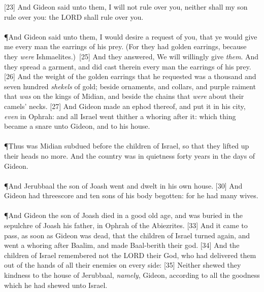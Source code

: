 [23] \textcolor[cmyk]{0.99998,1,0,0}{And Gideon said unto them, I will not rule over you, neither shall my son rule over you: the LORD shall rule over you.}\\
\\
\P \textcolor[cmyk]{0.99998,1,0,0}{And Gideon said unto them, I would desire a request of you, that ye would give me every man the earrings of his prey. (For they had golden earrings, because they \emph{were} Ishmaelites.)}\
[25] \textcolor[cmyk]{0.99998,1,0,0}{And they answered, We will willingly give \emph{them}. And they spread a garment, and did cast therein every man the earrings of his prey.}
[26] \textcolor[cmyk]{0.99998,1,0,0}{And the weight of the golden earrings that he requested was a thousand and seven hundred \emph{shekels} of gold; beside ornaments, and collars, and purple raiment that \emph{was} on the kings of Midian, and beside the chains that \emph{were} about their camels' necks.}
[27] \textcolor[cmyk]{0.99998,1,0,0}{And Gideon made an ephod thereof, and put it in his city, \emph{even} in Ophrah: and all Israel went thither a whoring after it: which thing became a snare unto Gideon, and to his house.}\\
\\
\P \textcolor[cmyk]{0.99998,1,0,0}{Thus was Midian subdued before the children of Israel, so that they lifted up their heads no more. And the country was in quietness forty years in the days of Gideon.}\\
\\
\P \textcolor[cmyk]{0.99998,1,0,0}{And Jerubbaal the son of Joash went and dwelt in his own house.}
[30] \textcolor[cmyk]{0.99998,1,0,0}{And Gideon had threescore and ten sons of his body begotten: for he had many wives.}\\
\\
\P \textcolor[cmyk]{0.99998,1,0,0}{And Gideon the son of Joash died in a good old age, and was buried in the sepulchre of Joash his father, in Ophrah of the Abiezrites.}
[33] \textcolor[cmyk]{0.99998,1,0,0}{And it came to pass, as soon as Gideon was dead, that the children of Israel turned again, and went a whoring after Baalim, and made Baal-berith their god.}  [34] \textcolor[cmyk]{0.99998,1,0,0}{And the children of Israel remembered not the LORD their God, who had delivered them out of the hands of all their enemies on every side:}
[35] \textcolor[cmyk]{0.99998,1,0,0}{Neither shewed they kindness to the house of Jerubbaal, \emph{namely}, Gideon, according to all the goodness which he had shewed unto Israel.}